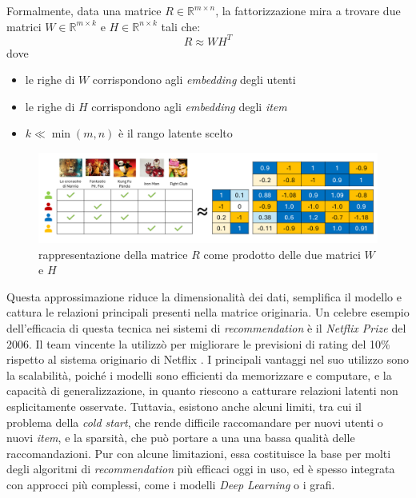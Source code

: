 Formalmente, data una matrice $R \in \mathbb{R}^{m \times n}$, la fattorizzazione mira a trovare due matrici $W \in \mathbb{R}^{m \times k}$ e $H \in \mathbb{R}^{n \times k}$ tali che:
\[
R \approx WH^T
\]
dove 
\begin{itemize}
    \item le righe di $W$ corrispondono agli \textit{embedding} degli utenti
    \item le righe di $H$ corrispondono agli \textit{embedding} degli \textit{item}
    \item $k \ll \min(m,n)$ è il rango latente scelto
\end{itemize}

\begin{figure}[htbp]
    \centering
    \includegraphics[scale=0.5]{figures/collaborative_filtering/matrix_factorization.PNG}
    \caption{rappresentazione della matrice $R$ come prodotto delle due matrici $W$ e $H$}
    \label{fig:matrix_factorization}
\end{figure}

Questa approssimazione riduce la dimensionalità dei dati, semplifica il modello e cattura le relazioni principali presenti nella matrice originaria. Un celebre esempio dell'efficacia di questa tecnica nei sistemi di \textit{recommendation} è il \textit{Netflix Prize} del 2006. Il team vincente la utilizzò per migliorare le previsioni di rating del 10\% rispetto al sistema originario di Netflix \cite{TheNP}. I principali vantaggi nel suo utilizzo sono la scalabilità, poiché i modelli sono efficienti da memorizzare e computare, e la capacità di generalizzazione, in quanto riescono a catturare relazioni latenti non esplicitamente osservate. Tuttavia, esistono anche alcuni limiti, tra cui il problema della \textit{cold start}, che rende difficile raccomandare per nuovi utenti o nuovi \textit{item}, e la sparsità, che può portare a una una bassa qualità delle raccomandazioni\cite{SVD_analysis}. Pur con alcune limitazioni, essa costituisce la base per molti degli algoritmi di \textit{recommendation} più efficaci oggi in uso, ed è spesso integrata con approcci più complessi, come i modelli \textit{Deep Learning} o i grafi.


